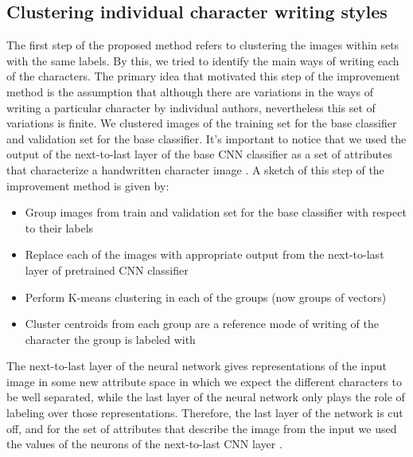 \documentclass{article}
\begin{document}
\subsection{Clustering individual character writing styles}

The first step of the proposed method refers to clustering the images within sets with the same labels. 
By this, we tried to identify the main ways of writing each of the characters. %
The primary idea that motivated this step of the improvement method is the assumption that although there are variations in the ways of writing a particular 
character by individual authors, nevertheless this set of variations is finite.
We clustered images of the training set for the base classifier and validation set for the base classifier. 
It's important to notice that we used the output of the next-to-last layer of the base CNN classifier as a set of attributes that characterize a handwritten character image \citep{nexttolast}. 
A sketch of this step of the improvement method is given by:
\begin{itemize}
  \item Group images from train and validation set for the base classifier with respect to their labels
  \item Replace each of the images with appropriate output from the next-to-last layer of pretrained CNN classifier
  \item Perform K-means clustering in each of the groups (now groups of vectors)
  \item Cluster centroids from each group are a reference mode of writing of the character the group is labeled with
\end{itemize}

The next-to-last layer of the neural network gives representations of the input image in some new attribute space in which we expect the different characters to be well separated,
while the last layer of the neural network only plays the role of labeling over those representations.
Therefore, the last layer of the network is cut off, and for the set of attributes that describe the image from the input we used the values of the neurons of the next-to-last CNN layer \citep{style1, style2}.
\end{document}
